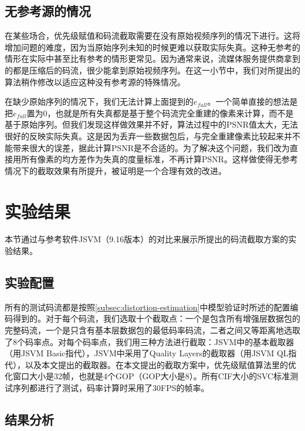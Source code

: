 \subsection{无参考源的情况}

在某些场合，优先级赋值和码流截取需要在没有原始视频序列的情况下进行。这将增加问题的难度，因为当原始序列未知的时候更难以获取实际失真。这种无参考的情形在实际中甚至比有参考的情形更常见。因为通常来说，流媒体服务提供商拿到的都是压缩后的码流，很少能拿到原始视频序列。在这一小节中，我们对所提出的算法稍作修改以适应这种没有参考源的特殊情况。

在缺少原始序列的情况下，我们无法计算上面提到的$e_{full}$。一个简单直接的想法是把$e_{full}$置为0，也就是所有失真都是基于整个码流完全重建的像素来计算，而不是基于原始序列。但我们发现这样做效果并不好，算法过程中的PSNR值太大，无法很好的反映实际失真。这是因为丢弃一些数据包后，与完全重建像素比较起来并不能带来很大的误差，据此计算PSNR是不合适的。为了解决这个问题，我们改为直接用所有像素的均方差作为失真的度量标准，不再计算PSNR。这样做使得无参考情况下的截取效果有所提升，被证明是一个合理有效的改进。

\section{实验结果}

本节通过与参考软件JSVM（9.16版本）的对比来展示所提出的码流截取方案的实验结果。

\subsection{实验配置}

所有的测试码流都是按照\ref{subsec:distortion-estimation}中模型验证时所述的配置编码得到的。对于每个码流，我们选取十个截取点：一个是包含所有增强层数据包的完整码流，一个是只含有基本层数据包的最低码率码流，二者之间又等距离地选取了8个码率点。对每个码率点，我们用三种方法进行截取：JSVM中的基本截取器（用JSVM Basic指代），JSVM中采用了Quality Layers的截取器（用JSVM QL指代），以及本文提出的截取器。在本文提出的截取方案中，优先级赋值算法里的优化窗口大小是32帧，也就是4个GOP（GOP大小是8）。所有CIF大小的SVC标准测试序列都进行了测试，码率计算时采用了30FPS的帧率。

\subsection{结果分析}

